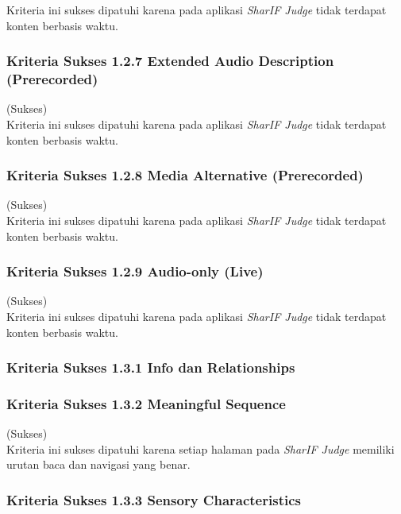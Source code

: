 Kriteria ini sukses dipatuhi karena pada aplikasi \textit{SharIF Judge} tidak terdapat konten berbasis waktu.

\subsubsection{Kriteria Sukses 1.2.7 Extended Audio Description (Prerecorded)}
\label{subsubsec:kepatuhan_kriteria_1.2.7}
(Sukses) \\

Kriteria ini sukses dipatuhi karena pada aplikasi \textit{SharIF Judge} tidak terdapat konten berbasis waktu.

\subsubsection{Kriteria Sukses 1.2.8 Media Alternative (Prerecorded)}
\label{subsubsec:kepatuhan_kriteria_1.2.8}
(Sukses) \\

Kriteria ini sukses dipatuhi karena pada aplikasi \textit{SharIF Judge} tidak terdapat konten berbasis waktu.

\subsubsection{Kriteria Sukses 1.2.9 Audio-only (Live)}
\label{subsubsec:kepatuhan_kriteria_1.2.9}
(Sukses) \\

Kriteria ini sukses dipatuhi karena pada aplikasi \textit{SharIF Judge} tidak terdapat konten berbasis waktu.

\subsubsection{Kriteria Sukses 1.3.1 Info dan Relationships}
\label{subsubsec:kepatuhan_kriteria_1.3.1}


\subsubsection{Kriteria Sukses 1.3.2 Meaningful Sequence}
\label{subsubsec:kepatuhan_kriteria_1.3.2}
(Sukses) \\

Kriteria ini sukses dipatuhi karena setiap halaman pada \textit{SharIF Judge} memiliki urutan baca dan navigasi yang benar.

\subsubsection{Kriteria Sukses 1.3.3 Sensory Characteristics}
\label{subsubsec:kepatuhan_kriteria_1.3.3}


